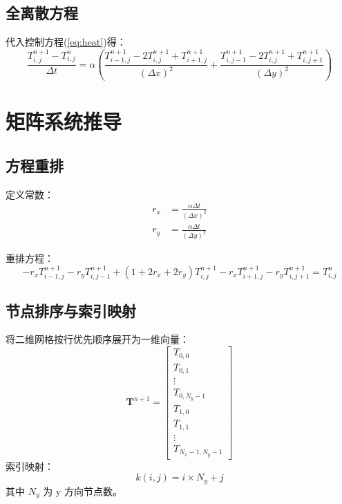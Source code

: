\documentclass{ctexart}
\begin{document}
\subsection{全离散方程}
代入控制方程(\ref{eq:heat})得：
\begin{equation}
\frac{T_{i,j}^{n+1} - T_{i,j}^n}{\Delta t} = \alpha \left( \frac{T_{i-1,j}^{n+1} - 2T_{i,j}^{n+1} + T_{i+1,j}^{n+1}}{(\Delta x)^2} + \frac{T_{i,j-1}^{n+1} - 2T_{i,j}^{n+1} + T_{i,j+1}^{n+1}}{(\Delta y)^2} \right)
\end{equation}

\section{矩阵系统推导}

\subsection{方程重排}
定义常数：
\begin{align}
r_x &= \frac{\alpha \Delta t}{(\Delta x)^2} \\
r_y &= \frac{\alpha \Delta t}{(\Delta y)^2}
\end{align}

重排方程：
\begin{equation}
-r_x T_{i-1,j}^{n+1} - r_y T_{i,j-1}^{n+1} + (1 + 2r_x + 2r_y) T_{i,j}^{n+1} - r_x T_{i+1,j}^{n+1} - r_y T_{i,j+1}^{n+1} = T_{i,j}^n
\label{eq:discrete}
\end{equation}

\subsection{节点排序与索引映射}
将二维网格按行优先顺序展开为一维向量：
\begin{equation}
\mathbf{T}^{n+1} = \begin{bmatrix}
T_{0,0} \\
T_{0,1} \\
\vdots \\
T_{0,N_y-1} \\
T_{1,0} \\
T_{1,1} \\
\vdots \\
T_{N_x-1,N_y-1}
\end{bmatrix}
\end{equation}
索引映射：
\begin{equation}
k(i,j) = i \times N_y + j
\end{equation}
其中 $N_y$ 为 y 方向节点数。
\end{document}
